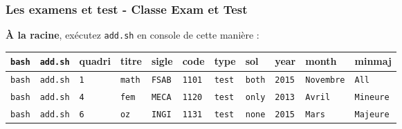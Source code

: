 \documentclass{beamer}
\begin{document}
\begin{frame}
    \frametitle{Les examens et test - Classe Exam et Test}
    \begin{exampleblock}{\textbf{À la racine}, exécutez \lstinline|add.sh| en
    console de cette manière :}
       \tiny \begin{tabular}{lllllllllll}
           \lstinline[basicstyle=\rm\tiny\ttfamily]|bash| & \lstinline[basicstyle=\rm\tiny\ttfamily]|add.sh| & quadri & titre & sigle & code & type & sol &
           year & month & minmaj \\
           \hline
	   \lstinline[basicstyle=\rm\tiny\ttfamily]|bash| &
	   \lstinline[basicstyle=\rm\tiny\ttfamily]|add.sh| &
	   \lstinline[basicstyle=\rm\tiny\ttfamily]|1| & \lstinline[basicstyle=\rm\tiny\ttfamily]|math|
	   & \lstinline[basicstyle=\rm\tiny\ttfamily]|FSAB| &
	   \lstinline[basicstyle=\rm\tiny\ttfamily]|1101| &
	   \lstinline[basicstyle=\rm\tiny\ttfamily]|test| &
	   \lstinline[basicstyle=\rm\tiny\ttfamily]|both| &
	   \lstinline[basicstyle=\rm\tiny\ttfamily]|2015| &
	   \lstinline[basicstyle=\rm\tiny\ttfamily]|Novembre| &
	   \lstinline[basicstyle=\rm\tiny\ttfamily]|All| \\
	   \lstinline[basicstyle=\rm\tiny\ttfamily]|bash| &
	   \lstinline[basicstyle=\rm\tiny\ttfamily]|add.sh| &
	   \lstinline[basicstyle=\rm\tiny\ttfamily]|4| & \lstinline[basicstyle=\rm\tiny\ttfamily]|fem|
	   & \lstinline[basicstyle=\rm\tiny\ttfamily]|MECA| &
	   \lstinline[basicstyle=\rm\tiny\ttfamily]|1120| &
	   \lstinline[basicstyle=\rm\tiny\ttfamily]|test| &
	   \lstinline[basicstyle=\rm\tiny\ttfamily]|only| &
	   \lstinline[basicstyle=\rm\tiny\ttfamily]|2013| &
	   \lstinline[basicstyle=\rm\tiny\ttfamily]|Avril| &
	   \lstinline[basicstyle=\rm\tiny\ttfamily]|Mineure| \\
	   \lstinline[basicstyle=\rm\tiny\ttfamily]|bash| &
	   \lstinline[basicstyle=\rm\tiny\ttfamily]|add.sh| &
	   \lstinline[basicstyle=\rm\tiny\ttfamily]|6| &
	   \lstinline[basicstyle=\rm\tiny\ttfamily]|oz| &
	   \lstinline[basicstyle=\rm\tiny\ttfamily]|INGI| &
	   \lstinline[basicstyle=\rm\tiny\ttfamily]|1131| &
	   \lstinline[basicstyle=\rm\tiny\ttfamily]|test| &
	   \lstinline[basicstyle=\rm\tiny\ttfamily]|none| &
	   \lstinline[basicstyle=\rm\tiny\ttfamily]|2015| &
	   \lstinline[basicstyle=\rm\tiny\ttfamily]|Mars| &
	   \lstinline[basicstyle=\rm\tiny\ttfamily]|Majeure| \\
       \end{tabular}
    \end{exampleblock}
    \begin{itemize}

\end{itemize}
\end{frame}
\end{document}
